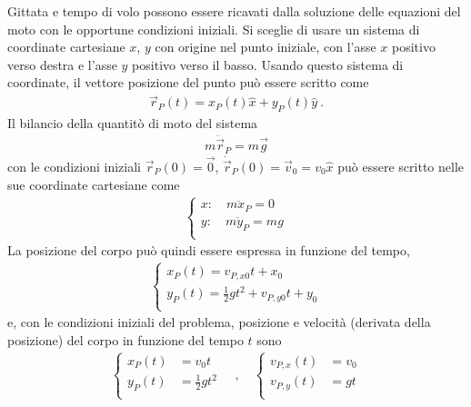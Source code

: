 \documentclass[letterpaper,10pt,italian]{jupyterBook}
\begin{document}
\sphinxAtStartPar
Gittata e tempo di volo possono essere ricavati dalla soluzione delle equazioni del moto con le opportune condizioni iniziali. Si sceglie di usare un sistema di coordinate cartesiane \(x\), \(y\) con origine nel punto iniziale, con l’asse \(x\) positivo verso destra e l’asse \(y\) positivo verso il basso. Usando questo sistema di coordinate, il vettore posizione del punto può essere scritto come
\begin{equation*}
\begin{split}\vec{r}_P(t) = x_P(t) \hat{x} + y_P(t) \hat{y} \ .\end{split}
\end{equation*}
\sphinxAtStartPar
Il bilancio della quantitò di moto del sistema
\begin{equation*}
\begin{split}m \ddot{\vec{r}}_P = m \vec{g}\end{split}
\end{equation*}
\sphinxAtStartPar
con le condizioni iniziali \(\vec{r}_P(0) = \vec{0}\), \(\dot{\vec{r}}_P(0) = \vec{v}_0 = v_0 \hat{x}\) può essere scritto nelle sue coordinate cartesiane come
\begin{equation*}
\begin{split}\begin{cases}
 x: \quad m \ddot{x}_P = 0 \\
 y: \quad m \ddot{y}_P = m g \\
\end{cases}\end{split}
\end{equation*}
\sphinxAtStartPar
La posizione del corpo può quindi essere espressa in funzione del tempo,
\begin{equation*}
\begin{split}\begin{cases}
  x_P(t) = v_{P,x0} t + x_0 \\
  y_P(t) = \frac{1}{2} g t^2 + v_{P,y0} t + y_0 \\
\end{cases}\end{split}
\end{equation*}
\sphinxAtStartPar
e, con le condizioni iniziali del problema, posizione e velocità (derivata della posizione) del corpo in funzione del tempo \(t\) sono
\begin{equation*}
\begin{split}
\begin{cases}
  x_P(t) & = v_0 t  \\
  y_P(t) & = \frac{1}{2} g t^2 \\
\end{cases}
\quad , \quad
\begin{cases}
  v_{P,x}(t) & = v_0 \\
  v_{P,y}(t) & = g t \\
\end{cases}
\end{split}
\end{equation*}
\end{document}
